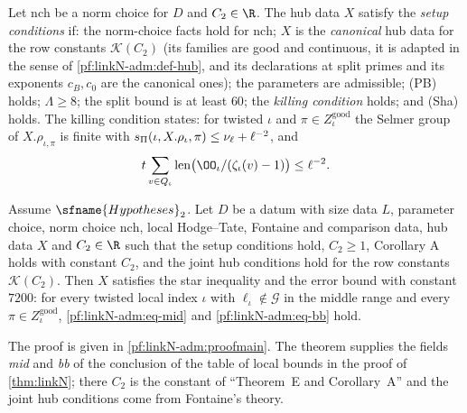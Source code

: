 \begin{definition}\label{pf:linkN-adm:def-setup}
Let $\mathrm{nch}$ be a norm choice for $D$ and $C_2\in\R$. The hub data $X$ satisfy the \emph{setup conditions} if: the
norm-choice facts hold for $\mathrm{nch}$; $X$ is the \emph{canonical} hub data for the row constants $\mathcal K(C_2)$ (its
families are good and continuous, it is adapted in the sense of \cref{pf:linkN-adm:def-hub}, and its declarations at
split primes and its exponents $c_B,c_0$ are the canonical ones); the parameters are admissible; (PB) holds;
$\Lambda\ge8$; the split bound is at least $60$; the \emph{killing condition} holds; and (Sha) holds. The killing
condition states: for twisted $\iota$ and $\pi\in Z^{\mathrm{good}}_\iota$ the Selmer group of $X.\rho_{\iota,\pi}$ is
finite with $s_{\Pi}(\iota,X.\rho_\iota,\pi)\le\nu_\ell+\ell^{-2}$, and
\begin{equation}\label{pf:linkN-adm:eq-kill}
t\sum_{v\in Q_\iota}\linkNadmlen\bigl(\OO_\iota/(\zeta_\iota(v)-1)\bigr)\le\ell^{-2}.
\end{equation}
\end{definition}

\begin{theorem}\label{pf:linkN-adm:main}
Assume $\sfname{Hypotheses}_2$. Let $D$ be a datum with size data $L$, parameter choice, norm choice
$\mathrm{nch}$, local Hodge--Tate, Fontaine and comparison data, hub data $X$ and $C_2\in\R$ such that the setup
conditions hold, $C_2\ge1$, Corollary A holds with constant $C_2$, and the joint hub conditions hold for the row constants
$\mathcal K(C_2)$. Then $X$ satisfies the star inequality and the error bound with constant $7200$: for every twisted local
index $\iota$ with $\ell_\iota\notin\mathcal G$ in the middle range and every $\pi\in Z^{\mathrm{good}}_\iota$,
\eqref{pf:linkN-adm:eq-mid} and \eqref{pf:linkN-adm:eq-bb} hold.
\end{theorem}

The proof is given in \cref{pf:linkN-adm:proofmain}. The theorem supplies the fields \emph{mid} and \emph{bb} of the
conclusion of the table of local bounds in the proof of \cref{thm:linkN}; there $C_2$ is the constant of
``Theorem~E and Corollary~A'' and the joint hub conditions come from Fontaine's theory.

